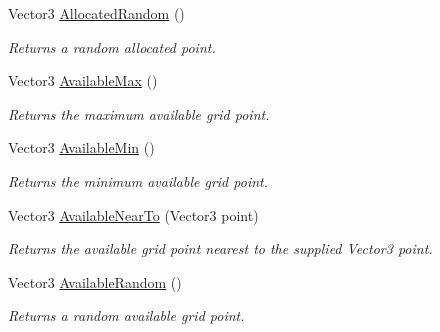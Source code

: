 \begin{DoxyCompactItemize}
Vector3 \mbox{\hyperlink{class_room_kit_1_1_coord_grid_a5b5e606530fdff2cea08391a1bf59f6e}{Allocated\+Random}} ()
\begin{DoxyCompactList}\small\item\em Returns a random allocated point. \end{DoxyCompactList}\item 
Vector3 \mbox{\hyperlink{class_room_kit_1_1_coord_grid_a408f51d641e9bb3ec4e59fe8b62a0163}{Available\+Max}} ()
\begin{DoxyCompactList}\small\item\em Returns the maximum available grid point. \end{DoxyCompactList}\item 
Vector3 \mbox{\hyperlink{class_room_kit_1_1_coord_grid_a1b5d8ba25a0e67b9f9b7c6123ae387c5}{Available\+Min}} ()
\begin{DoxyCompactList}\small\item\em Returns the minimum available grid point. \end{DoxyCompactList}\item 
Vector3 \mbox{\hyperlink{class_room_kit_1_1_coord_grid_a8f23bb3e3de818686337ab83304a576d}{Available\+Near\+To}} (Vector3 point)
\begin{DoxyCompactList}\small\item\em Returns the available grid point nearest to the supplied Vector3 point. \end{DoxyCompactList}\item 
Vector3 \mbox{\hyperlink{class_room_kit_1_1_coord_grid_afa27190e6d89efd3554f6cb95bf4c3e3}{Available\+Random}} ()
\begin{DoxyCompactList}\small\item\em Returns a random available grid point. \end{DoxyCompactList}\end{DoxyCompactItemize}
